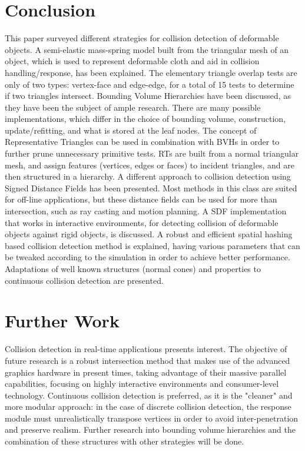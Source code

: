 \section{Conclusion}
\label{section:conclusion}

This paper surveyed different strategies for collision detection of deformable objects. A semi-elastic mass-spring model built from the triangular mesh of an object, which is used to represent deformable cloth and aid in collision handling/response, has been explained. The elementary triangle overlap tests are only of two types: vertex-face and edge-edge, for a total of 15 tests to determine if two triangles intersect. Bounding Volume Hierarchies have been discussed, as they have been the subject of ample research. There are many possible implementations, which differ in the choice of bounding volume, construction, update/refitting, and what is stored at the leaf nodes. The concept of Representative Triangles can be used in combination with BVHs in order to further prune unnecessary primitive tests. RTs are built from a normal triangular mesh, and assign features (vertices, edges or faces) to incident triangles, and are then structured in a hierarchy. A different approach to collision detection using Signed Distance Fields has been presented. Most methods in this class are suited for off-line applications, but these distance fields can be used for more than intersection, such as ray casting and motion planning. A SDF implementation that works in interactive environments, for detecting collision of deformable objects against rigid objects, is discussed. A robust and efficient spatial hashing based collision detection method is explained, having various parameters that can be tweaked according to the simulation in order to achieve better performance. Adaptations of well known structures (normal cones) and properties to continuous collision detection are presented.

\section{Further Work}
\label{section:further}

Collision detection in real-time applications presents interest. The objective of future research is a robust intersection method that makes use of the advanced graphics hardware in present times, taking advantage of their massive parallel capabilities, focusing on highly interactive environments and consumer-level technology. Continuous collision detection is preferred, as it is the "cleaner" and more modular approach: in the case of discrete collision detection, the response module must unrealistically transpose vertices in order to avoid inter-penetration and preserve realism. Further research into bounding volume hierarchies and the combination of these structures with other strategies will be done.